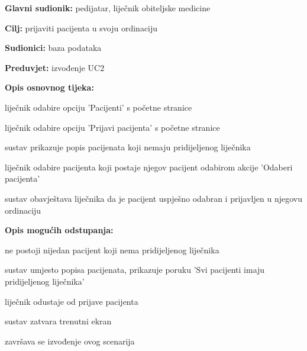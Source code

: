                     \noindent {}
					\begin{packed_item}
	
						\item \textbf{Glavni sudionik: }pedijatar, liječnik obiteljske medicine
						\item  \textbf{Cilj:} prijaviti pacijenta u svoju ordinaciju
						\item  \textbf{Sudionici:} baza podataka
						\item  \textbf{Preduvjet:} izvođenje UC2
						\item  \textbf{Opis osnovnog tijeka:}
						
						\item[] \begin{packed_enum}
							\item liječnik odabire opciju 'Pacijenti' s početne stranice
							\item liječnik odabire opciju 'Prijavi pacijenta' s početne stranice
							\item sustav prikazuje popis pacijenata koji nemaju pridijeljenog liječnika
							\item liječnik odabire pacijenta koji postaje njegov pacijent odabirom akcije 'Odaberi pacijenta'
							\item sustav obavještava liječnika da je pacijent uspješno odabran i prijavljen u njegovu ordinaciju

						\end{packed_enum}
						
						\item  \textbf{Opis mogućih odstupanja:}
						
						\item[] \begin{packed_item}
	
							\item[3.a] ne postoji nijedan pacijent koji nema pridijeljenog liječnika
							\item[] \begin{packed_enum}
								\item sustav umjesto popisa pacijenata, prikazuje poruku 'Svi pacijenti imaju pridijeljenog liječnika'
							\end{packed_enum}
							\item[4.a] liječnik odustaje od prijave pacijenta
							\item[] \begin{packed_enum}
								\item sustav zatvara trenutni ekran
								\item završava se izvođenje ovog scenarija
							\end{packed_enum}
							
						\end{packed_item}
					\end{packed_item}

